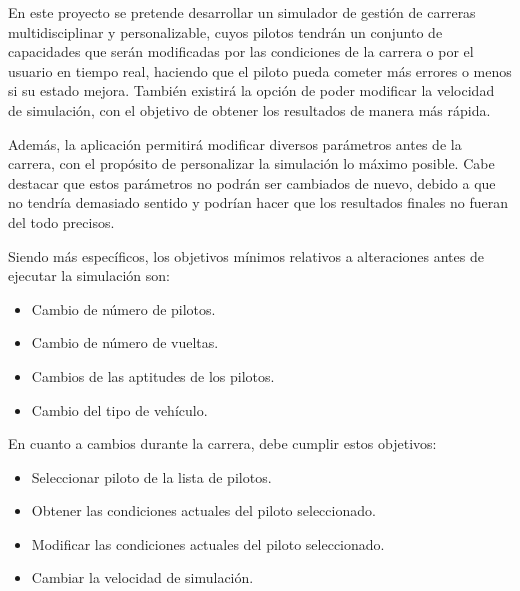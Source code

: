En este proyecto se pretende desarrollar un simulador de gestión de carreras multidisciplinar y personalizable, cuyos pilotos tendrán un conjunto de capacidades que serán modificadas por las condiciones de la carrera o por el usuario en tiempo real, haciendo que el piloto pueda cometer más errores o menos si su estado mejora. También existirá la opción de poder modificar la velocidad de simulación, con el objetivo de obtener los resultados de manera más rápida.

\bigskip

Además, la aplicación permitirá modificar diversos parámetros antes de la carrera, con el propósito de personalizar la simulación lo máximo posible. Cabe destacar que estos parámetros no podrán ser cambiados de nuevo, debido a que no tendría demasiado sentido y podrían hacer que los resultados finales no fueran del todo precisos.


\bigskip


Siendo más específicos, los objetivos mínimos relativos a alteraciones antes de ejecutar la simulación son:

\begin{itemize}
   \item Cambio de número de pilotos.
   \item Cambio de número de vueltas.
   \item Cambios de las aptitudes de los pilotos. %
   \item Cambio del tipo de vehículo.
\end{itemize}

\bigskip

En cuanto a cambios durante la carrera, debe cumplir estos objetivos:

\begin{itemize}
   \item Seleccionar piloto de la lista de pilotos.
   \item Obtener las condiciones actuales del piloto seleccionado.
   \item Modificar las condiciones actuales del piloto seleccionado.
   \item Cambiar la velocidad de simulación.
\end{itemize}

